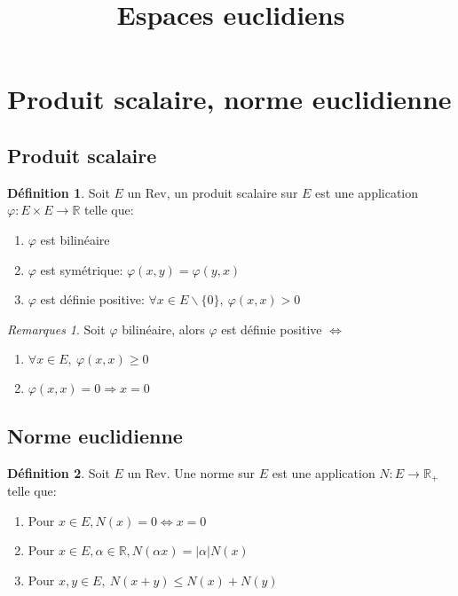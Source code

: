 \documentclass[fleqn]{article}
\title{Espaces euclidiens}
\date{}
\theoremstyle{definition} \newtheorem*{defi}{D\'efinition}
\theoremstyle{definition} \newtheorem*{theo}{Th\'eor\`eme}
\theoremstyle{definition} \newtheorem*{coro}{Corollaire}
\theoremstyle{remark} \newtheorem*{rqs}{Remarques}
\theoremstyle{definition} \newtheorem*{prop}{Propri\'et\'e}
\begin{document}
\maketitle

\section{Produit scalaire, norme euclidienne}

\subsection{Produit scalaire}

\begin{defi} Soit $E$ un Rev, un produit scalaire sur $E$ est une application $\varphi : E \times E \rightarrow \mathbb{R}$ telle que:
	\begin{enumerate}
		\item $\varphi$ est bilin\'eaire
		\item $\varphi$ est sym\'etrique: $\varphi(x,y) = \varphi(y,x)$
		\item $\varphi$ est d\'efinie positive: $\forall x \in E \backslash \{0\},\ \varphi(x,x) > 0$
	\end{enumerate}
\end{defi}

\begin{rqs} Soit $\varphi$ bilin\'eaire, alors $\varphi$ est d\'efinie positive $\Leftrightarrow$ \begin{enumerate}
	\item $\forall x \in E,\ \varphi(x,x) \geq 0$
	\item $\varphi(x,x) = 0 \Rightarrow x = 0$
	\end{enumerate}
\end{rqs}


\subsection{Norme euclidienne}

\begin{defi} Soit $E$ un Rev. Une norme sur $E$ est une application $N:E \rightarrow \mathbb{R}_+$ telle que:
	\begin{enumerate}
		\item Pour $x \in E, N(x) = 0 \Leftrightarrow x = 0$
		\item Pour $x \in E, \alpha \in \mathbb{R}, N(\alpha x) = |\alpha| N(x)$
		\item Pour $x,y \in E,\ N(x+y) \leq N(x) + N(y)$
	\end{enumerate}
\end{defi}
\end{document}
